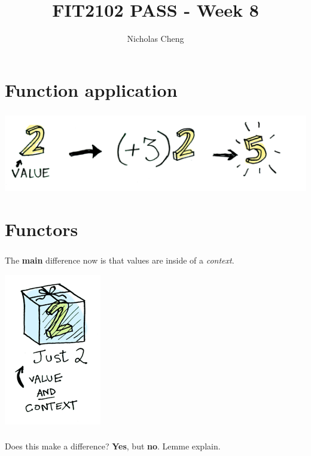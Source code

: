 \documentclass{beamer}
\title{FIT2102 PASS - Week 8}
\author{Nicholas Cheng}
\begin{document}
\begin{frame}
    \titlepage
\end{frame}

\begin{frame}
    \tableofcontents
\end{frame}


\section{Function application}
\begin{frame}
    \frametitle{\insertsection}
    \centerline{
        \includegraphics[scale=0.5]{images/value_apply.png}
    }
\end{frame}



\section{Functors}

\begin{frame}
    \frametitle{\insertsection}
    The \textbf{main} difference now is that values are inside of a \textit{context}.
    \centerline{
        \includegraphics[scale=0.5]{images/value_and_context.png}
    }
\end{frame}

\begin{frame}
    \frametitle{\insertsection}
    Does this make a difference?
    \textbf{Yes}, but \textbf{no}.
    Lemme explain.
\end{frame}
\end{document}
